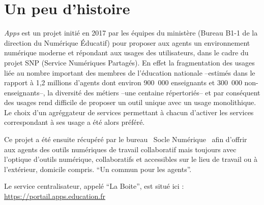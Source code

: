 \chapter{Un peu d'histoire}

\emph{Apps} est un projet initié en 2017 par les équipes du ministère (Bureau B1-1 de la direction du Numérique Éducatif) pour proposer aux agents un environnement numérique  moderne et répondant aux usages des utilisateurs, dans le cadre du projet SNP (Service Numériques Partagés). 
En effet la fragmentation des usages liée au nombre important des membres de l'éducation nationale --estimés dans le rapport à 1,2 millions d'agents dont environ 900~000 enseignants et 300~000 non-enseignants--, la diversité des métiers --une centaine répertoriés-- et par conséquent des usages rend difficile de proposer un outil unique avec un usage monolithique. 
Le choix d'un agréggateur de services permettant à chacun d'activer les services correspondant à ses usage a été alors préféré.

Ce projet a été ensuite récupéré par le bureau \og~Socle Numérique~\fg{} afin d'offrir aux agents des outils numériques de travail collaboratif mais toujours avec l'optique d'outils numérique, collaboratifs et accessibles sur le lieu de travail ou à l'extérieur, domicile compris. ``Un commun pour les agents''.

Le service centralisateur, appelé ``La Boite'',  est situé ici : \url{https://portail.apps.education.fr}

